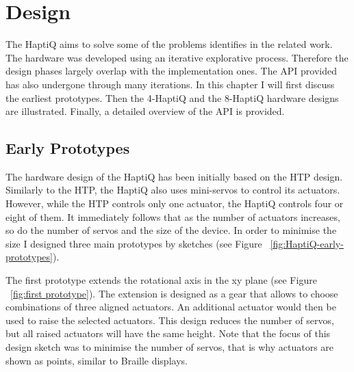 \chapter{Design}

The HaptiQ aims to solve some of the problems identifies in the related work. The hardware was developed using an iterative explorative process. Therefore the design phases largely overlap with the implementation ones. The API provided has also undergone through many iterations. In this chapter I will first discuss the earliest prototypes. Then the 4-HaptiQ and the 8-HaptiQ hardware designs are illustrated. Finally, a detailed overview of the API is provided.

\section{Early Prototypes}
The hardware design of the HaptiQ has been initially based on the HTP design. Similarly to the HTP, the HaptiQ also uses mini-servos to control its actuators. However, while the HTP controls only one actuator, the HaptiQ controls four or eight of them. It immediately follows that as the number of actuators increases, so do the number of servos and the size of the device. In order to minimise the size I designed three main prototypes by sketches (see Figure ~\ref{fig:HaptiQ-early-prototypes}). 

The first prototype extends the rotational axis in the xy plane (see Figure ~\ref{fig:first prototype}). The extension is designed as a gear that allows to choose combinations of three aligned actuators. An additional actuator would then be used to raise the selected actuators. This design reduces the number of servos, but all raised actuators will have the same height. Note that the focus of this design sketch was to minimise the number of servos, that is why actuators are shown as points, similar to Braille displays.

